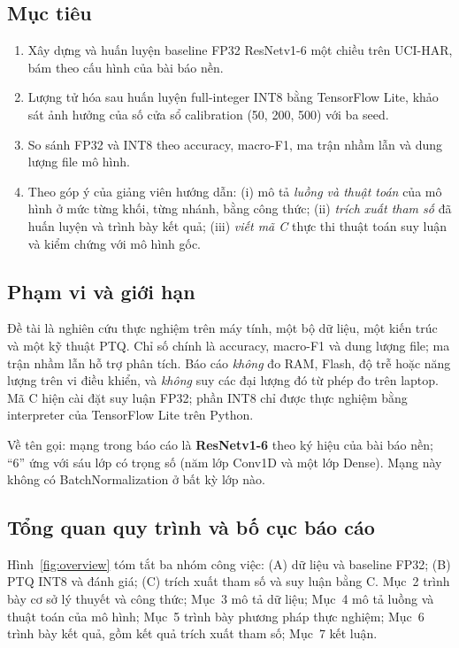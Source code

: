 \documentclass[12pt,a4paper]{article}
\begin{document}
\subsection{Mục tiêu}
\begin{enumerate}
  \item Xây dựng và huấn luyện baseline FP32 ResNetv1-6 một chiều trên UCI-HAR, bám theo cấu hình của bài báo nền.
  \item Lượng tử hóa sau huấn luyện full-integer INT8 bằng TensorFlow Lite, khảo sát ảnh hưởng của số cửa sổ calibration (50, 200, 500) với ba seed.
  \item So sánh FP32 và INT8 theo accuracy, macro-F1, ma trận nhầm lẫn và dung lượng file mô hình.
  \item Theo góp ý của giảng viên hướng dẫn: (i) mô tả \emph{luồng và thuật toán} của mô hình ở mức từng khối, từng nhánh, bằng công thức; (ii) \emph{trích xuất tham số} đã huấn luyện và trình bày kết quả; (iii) \emph{viết mã C} thực thi thuật toán suy luận và kiểm chứng với mô hình gốc.
\end{enumerate}

\subsection{Phạm vi và giới hạn}
Đề tài là nghiên cứu thực nghiệm trên máy tính, một bộ dữ liệu, một kiến trúc và một kỹ thuật PTQ. Chỉ số chính là accuracy, macro-F1 và dung lượng file; ma trận nhầm lẫn hỗ trợ phân tích. Báo cáo \emph{không} đo RAM, Flash, độ trễ hoặc năng lượng trên vi điều khiển, và \emph{không} suy các đại lượng đó từ phép đo trên laptop. Mã C hiện cài đặt suy luận FP32; phần INT8 chỉ được thực nghiệm bằng interpreter của TensorFlow Lite trên Python.

Về tên gọi: mạng trong báo cáo là \textbf{ResNetv1-6} theo ký hiệu của bài báo nền; ``6'' ứng với sáu lớp có trọng số (năm lớp Conv1D và một lớp Dense). Mạng này không có BatchNormalization ở bất kỳ lớp nào.

\subsection{Tổng quan quy trình và bố cục báo cáo}
Hình~\ref{fig:overview} tóm tắt ba nhóm công việc: (A) dữ liệu và baseline FP32; (B) PTQ INT8 và đánh giá; (C) trích xuất tham số và suy luận bằng C. Mục~2 trình bày cơ sở lý thuyết và công thức; Mục~3 mô tả dữ liệu; Mục~4 mô tả luồng và thuật toán của mô hình; Mục~5 trình bày phương pháp thực nghiệm; Mục~6 trình bày kết quả, gồm kết quả trích xuất tham số; Mục~7 kết luận.
\end{document}
